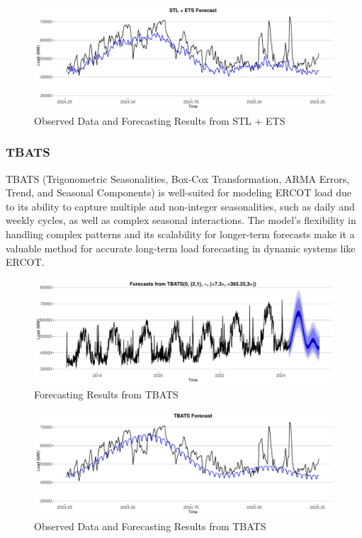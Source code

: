 \documentclass[
]{article}
\begin{document}
\begin{figure}
\centering
\includegraphics{FinalProject_Report_files/figure-latex/unnamed-chunk-5-1.pdf}
\caption{Observed Data and Forecasting Results from STL + ETS}
\end{figure}

\newpage

\subsubsection{TBATS}\label{tbats}

TBATS (Trigonometric Seasonalities, Box-Cox Transformation, ARMA Errors,
Trend, and Seasonal Components) is well-suited for modeling ERCOT load
due to its ability to capture multiple and non-integer seasonalities,
such as daily and weekly cycles, as well as complex seasonal
interactions. The model's flexibility in handling complex patterns and
its scalability for longer-term forecasts make it a valuable method for
accurate long-term load forecasting in dynamic systems like ERCOT.

\begin{figure}
\centering
\includegraphics{FinalProject_Report_files/figure-latex/unnamed-chunk-6-1.pdf}
\caption{Forecasting Results from TBATS}
\end{figure}

\begin{figure}
\centering
\includegraphics{FinalProject_Report_files/figure-latex/unnamed-chunk-7-1.pdf}
\caption{Observed Data and Forecasting Results from TBATS}
\end{figure}
\end{document}
